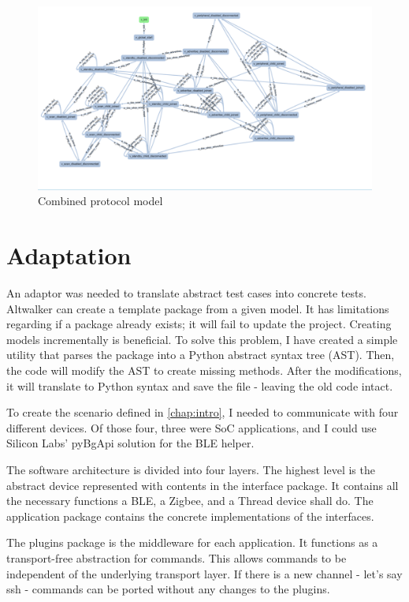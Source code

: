 \begin{figure}
    \centering
    \includegraphics[width=150mm, keepaspectratio]{figures/combined_model.png}
    \caption{Combined protocol model}
    \label{fig:meth_combined_model}
\end{figure}


\section{Adaptation}
\label{sec:meth:ada}

An adaptor was needed to translate abstract test cases into concrete tests. Altwalker can create a template package from a given model. It has limitations regarding if a package already exists; it will fail to update the project. Creating models incrementally is beneficial. To solve this problem, I have created a simple utility that parses the package into a Python abstract syntax tree (AST). Then, the code will modify the AST to create missing methods. After the modifications, it will translate to Python syntax and save the file - leaving the old code intact.

To create the scenario defined in \autoref{chap:intro}, I needed to communicate with four different devices. Of those four, three were SoC applications, and I could use Silicon Labs' pyBgApi solution for the BLE helper.

The software architecture is divided into four layers. The highest level is the abstract device represented with contents in the interface package. It contains all the necessary functions a BLE, a Zigbee, and a Thread device shall do. The application package contains the concrete implementations of the interfaces.

The plugins package is the middleware for each application. It functions as a transport-free abstraction for commands. This allows commands to be independent of the underlying transport layer. If there is a new channel - let's say ssh - commands can be ported without any changes to the plugins.

